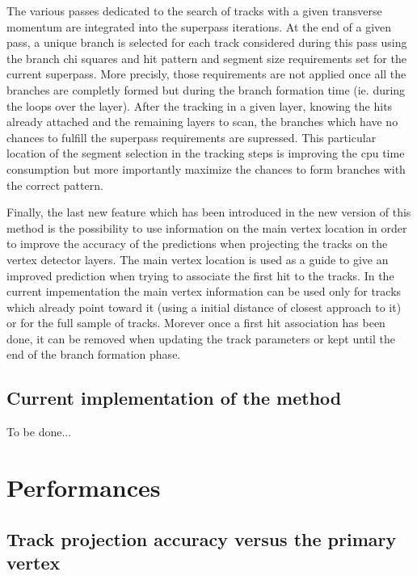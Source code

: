 \documentclass[twoside]{article}
\begin{document}
The various passes dedicated to the search of tracks with a given
transverse momentum are integrated into the superpass iterations. At
the end of a given pass, a unique branch is selected for each track
considered during this pass using the branch chi squares and hit
pattern and segment size requirements set for the current superpass.
More precisly, those requirements are not applied once all the
branches are completly formed but during the branch formation time
(ie. during the loops over the layer). After the tracking in a given
layer, knowing the hits already attached and the remaining layers to
scan, the branches which have no chances to fulfill the superpass
requirements are supressed. This particular location of the segment
selection in the tracking steps is improving the cpu time consumption
but more importantly maximize the chances to form branches with the
correct pattern.

Finally, the last new feature which has been introduced in the new
version of this method is the possibility to use information on the
main vertex location in order to improve the accuracy of the
predictions when projecting the tracks on the vertex detector layers.
The main vertex location is used as a guide to give an improved
prediction when trying to associate the first hit to the tracks. In
the current impementation the main vertex information can be used only
for tracks which already point toward it (using a initial distance of
closest approach to it) or for the full sample of tracks. Morever once
a first hit association has been done, it can be removed when updating
the track parameters or kept until the end of the branch formation
phase.

\subsection{Current implementation of the method}

To be done...



\section{Performances}
\label{sec:performances}

\subsection{Track projection accuracy versus the primary vertex}
\end{document}
